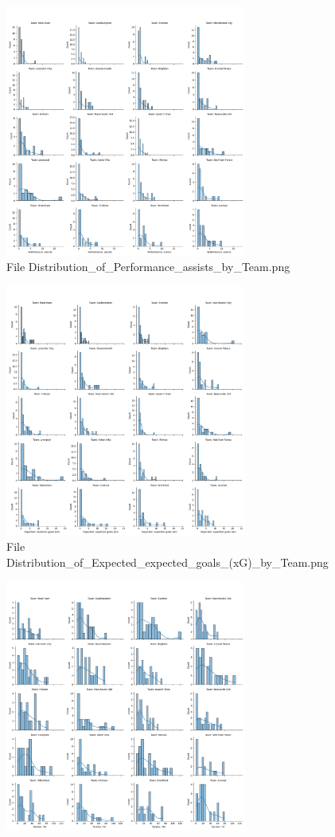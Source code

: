 \documentclass[12pt]{report}
\begin{document}
{{\begin{figure}[h]
    \centering
    \includegraphics[width=300px]{Distribution_of_Performance_assists_by_Team.png}
    \caption{File Distribution\_of\_Performance\_assists\_by\_Team.png} %
    \label{fig:p3}
\end{figure}
\begin{figure}[h]
    \centering
    \includegraphics[width=300px]{Distribution_of_Expected_expected_goals_(xG)_by_Team.png}
    \caption{File Distribution\_of\_Expected\_expected\_goals\_(xG)\_by\_Team.png} %
    \label{fig:p4}
\end{figure}
\begin{figure}[h]
    \centering
    \includegraphics[width=300px]{Distribution_of_Tackles_Tkl_by_Team.png}

\end{figure}}}
\end{document}
